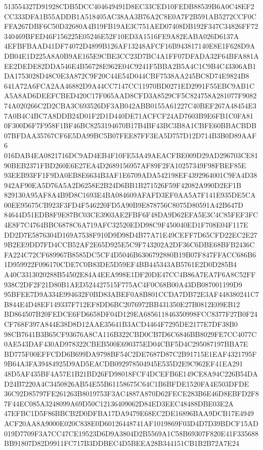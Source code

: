 \documentclass[UTF8,fontset=fandol,zihao=-4,a4paper]{ctexart}
\begin{document}
{{513554327D91928CDB5DCC404649491D8EC33CED10FEDB88539B6A0C48EF2CC333DFA1B55ADDB1A518405AC38AA3B76A2C8E0A7F2B591AB5272CCF0C
FFA267DBF6C50D32680A4B19FB19AE3C751AED07408DB192F347C34826FF72340469BFED46F156225E05246E52F10ED3A1516FE9A82EABA026D6137A
4EFBFBAAD41DF74072D4899B126AF13248AFCF16B943817140E8E1F628D9ADB04E1D225A8A0B9AE165E9CBE3CC23D7BC4A1FF07DFADA32F64BFA881A
EE2DEDE82DDA546E4B56728E962E04C9241F5BBA2B5A4C1C9B4C43306AB1DA1753028D48C0E3A872C9F20C44E54D044CBF7538AA245BC8D74E9824B8
641A72A6FCA2AA46882D9A44CC7147CC11970BD0271ED2991F55EBC9AB1CA5A8AD6DEEFCBED420C17F065AAD8CFD3A8529CF5C824758A281077F9082
74A020266C2D2CBA3C693526DF3AB042ABB0155A61227C40BEF267A48454E37A0B4C4BC7A8DDB24D01F2D1D440DE71ACFCF24AD7603B9E6FB1C0FA81
0F300D6F7F958F1BF46BC8253194670B17B4BF43BC3B8A1CBFE60BBACBDB07BFDAA35767CF6E5DA99BC5B07FEE87FF3EA5D757D12D714B3B0D89AAF6
016DAB4EA0821716DC9AD4EB4F10FE53A49AEACFBE009D29AD296703CE8190BEB2371FBD260E6E27EA4D2689156957AF89F2FA10257349F98FBEF85E
93EEB93FF1F9DA0EB8E6634B3AF1E6709ADA542198EF4392964001C9FA4D38942AF90EA5D76A5A2D6258E2B24D6BB1B271526F59F42082A990D2EF1B
829130A95AF8A4B9D8C1693E4BA084609AFAFD3EF0AA5A7F141E935DE5CA00EE95675CB923F3FD4F546220FD5A90B9E878756C8075D80591A42B647D
84644D51EDB8F9E87BC03CE3903AE2FBF6F48DA9D62EFA5E3C4C85FEF3FC4E8F7C4764BBC6878C6A719AFC32520EDD98C9F450040ED1F708E04F117E
DD2D7E5876304D169A7538F910D9D98D4B77A71E49CEFF7D65CFD22EC2E279B2EE9DD7FD4CCB52AF2E65D925E5C9F743202A2DF36C6DBE68BFB2436C
FA224C72CF689967B8585DC5CF4D5046B6306792880B19B07F847FFACC686B61D959922F096170CDE7C0B83DE5D59EF4BB445343AB5761E2D0D285B4
A40C3313020288B54502E84A4EEA998E1DF20DE47CC4B86A7EA7F6A8C52FF938C2DF2F21D80B1AED524427515F775AC4F0C68B00A43DB087001199D9
95BFEE7D9A334E994632F0BD83ABEF0A8B801CCDA7DB72E3AF448380241C7B844E4D48EF149337F712EF8DD6BC2076972BB431350E27B0812E09EB12
BD864507B20FEDCE6FD6658DF04D129EA685611846350998FCC8377F27B0F24CF768F397A844E38D8D12AAE35641B3ACD4464F7295DE2177E7DF38B0
98CB7641B3B65CF93676A8CA116B322CBD0CB7D6C6846BB8029FE7CC4077C0AE543DAF430AD978322CBEB500E690375ED04CBF5D4C295087197BBA7E
BD775F00EFFCDD6B699DA9798BF54C2DE7687D87C2B91715E1EAF4321795F9B64A3FA39484925D9AD5EACDB092978504945E535D2E9C962EF41EA291
48D5AF435BF4A57E1B21BD26FD98018FCF4DCEFB6E149CE8A94C226B54DAD24B7220A4C3450826AB54E55B61158675C64C1B6BFDE1520FA4E503DFDE
36C92D85797FE261263B8019753F3AC4887A870D62FECE283B6E46D8EBFD2F87F44EC085A3248099A69D50C12136409062D84ED3EEC48488DBE03E2A
47EFBC1D5F86BBCB2D0DFBA17DA9479E68EC2DE16896BAA9DCB17E4949ACF20AA8A9000E020C838E0D60126448741AF1019869F03D4D7D39BDCF15AD
019D7709F3A7CC47CE19523D6D9A3804D2B5569A1C58B69307F820E41F335688BB91807D82D9911FC717B3DDBEC4D5BEEA28B344151CB1B2B72A7E24
}}
\end{document}
